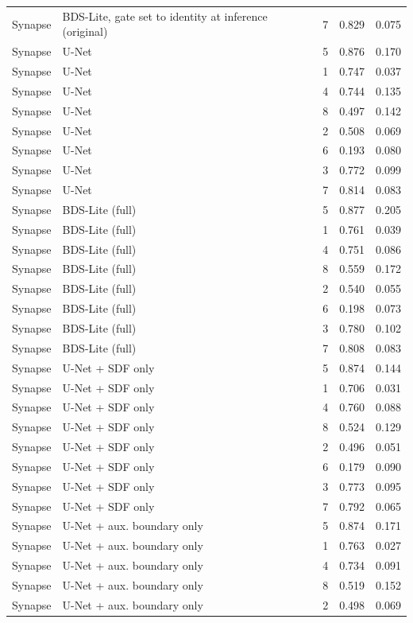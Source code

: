 \begin{longtable}{lllll}
Synapse & BDS-Lite, gate set to identity at inference (original) & 7 & 0.829 & 0.075 \\
Synapse & U-Net & 5 & 0.876 & 0.170 \\
Synapse & U-Net & 1 & 0.747 & 0.037 \\
Synapse & U-Net & 4 & 0.744 & 0.135 \\
Synapse & U-Net & 8 & 0.497 & 0.142 \\
Synapse & U-Net & 2 & 0.508 & 0.069 \\
Synapse & U-Net & 6 & 0.193 & 0.080 \\
Synapse & U-Net & 3 & 0.772 & 0.099 \\
Synapse & U-Net & 7 & 0.814 & 0.083 \\
Synapse & BDS-Lite (full) & 5 & 0.877 & 0.205 \\
Synapse & BDS-Lite (full) & 1 & 0.761 & 0.039 \\
Synapse & BDS-Lite (full) & 4 & 0.751 & 0.086 \\
Synapse & BDS-Lite (full) & 8 & 0.559 & 0.172 \\
Synapse & BDS-Lite (full) & 2 & 0.540 & 0.055 \\
Synapse & BDS-Lite (full) & 6 & 0.198 & 0.073 \\
Synapse & BDS-Lite (full) & 3 & 0.780 & 0.102 \\
Synapse & BDS-Lite (full) & 7 & 0.808 & 0.083 \\
Synapse & U-Net + SDF only & 5 & 0.874 & 0.144 \\
Synapse & U-Net + SDF only & 1 & 0.706 & 0.031 \\
Synapse & U-Net + SDF only & 4 & 0.760 & 0.088 \\
Synapse & U-Net + SDF only & 8 & 0.524 & 0.129 \\
Synapse & U-Net + SDF only & 2 & 0.496 & 0.051 \\
Synapse & U-Net + SDF only & 6 & 0.179 & 0.090 \\
Synapse & U-Net + SDF only & 3 & 0.773 & 0.095 \\
Synapse & U-Net + SDF only & 7 & 0.792 & 0.065 \\
Synapse & U-Net + aux. boundary only & 5 & 0.874 & 0.171 \\
Synapse & U-Net + aux. boundary only & 1 & 0.763 & 0.027 \\
Synapse & U-Net + aux. boundary only & 4 & 0.734 & 0.091 \\
Synapse & U-Net + aux. boundary only & 8 & 0.519 & 0.152 \\
Synapse & U-Net + aux. boundary only & 2 & 0.498 & 0.069 \\

\end{longtable}
